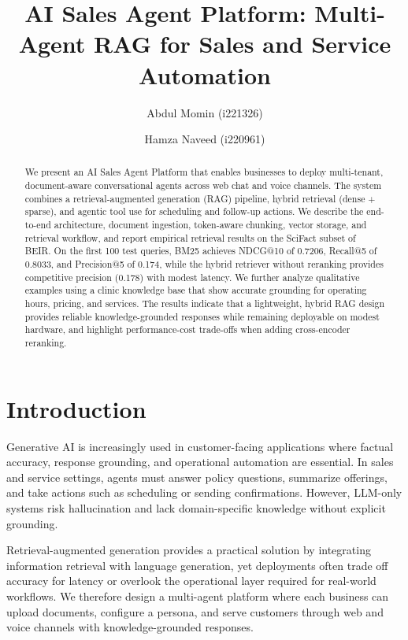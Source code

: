 \documentclass[runningheads]{llncs}
\title{AI Sales Agent Platform: Multi-Agent RAG for Sales and Service Automation}
\author{Abdul Momin (i221326) \and Hamza Naveed (i220961)}
\institute{Department of Computer Science, FAST NUCES}
\begin{document}
    \maketitle

    \begin{abstract}
    We present an AI Sales Agent Platform that enables businesses to deploy multi-tenant, document-aware conversational agents across web chat and voice channels. The system combines a retrieval-augmented generation (RAG) pipeline, hybrid retrieval (dense + sparse), and agentic tool use for scheduling and follow-up actions. We describe the end-to-end architecture, document ingestion, token-aware chunking, vector storage, and retrieval workflow, and report empirical retrieval results on the SciFact subset of BEIR. On the first 100 test queries, BM25 achieves NDCG@10 of 0.7206, Recall@5 of 0.8033, and Precision@5 of 0.174, while the hybrid retriever without reranking provides competitive precision (0.178) with modest latency. We further analyze qualitative examples using a clinic knowledge base that show accurate grounding for operating hours, pricing, and services. The results indicate that a lightweight, hybrid RAG design provides reliable knowledge-grounded responses while remaining deployable on modest hardware, and highlight performance-cost trade-offs when adding cross-encoder reranking.
    \end{abstract}

    \section{Introduction}
    Generative AI is increasingly used in customer-facing applications where factual accuracy, response grounding, and operational automation are essential. In sales and service settings, agents must answer policy questions, summarize offerings, and take actions such as scheduling or sending confirmations. However, LLM-only systems risk hallucination and lack domain-specific knowledge without explicit grounding.

    Retrieval-augmented generation provides a practical solution by integrating information retrieval with language generation, yet deployments often trade off accuracy for latency or overlook the operational layer required for real-world workflows. We therefore design a multi-agent platform where each business can upload documents, configure a persona, and serve customers through web and voice channels with knowledge-grounded responses.
\end{document}
